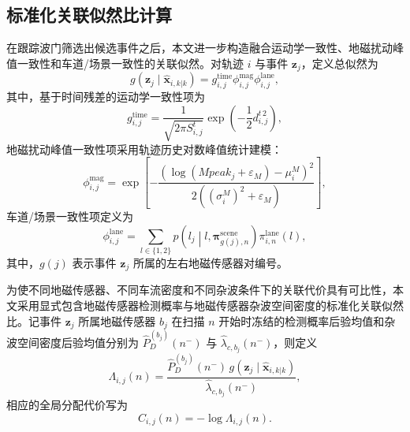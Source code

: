 \documentclass{xdupgthesis}
\begin{document}
\subsection{标准化关联似然比计算}

在跟踪波门筛选出候选事件之后，本文进一步构造融合运动学一致性、地磁扰动峰值一致性和车道/场景一致性的关联似然。对轨迹 $i$ 与事件 $\mathbf z_j$，定义总似然为
\begin{equation}
	g(\mathbf z_j\mid \hat{\mathbf x}_{i,k|k})
	=
	g_{i,j}^{\mathrm{time}}
	\phi_{i,j}^{\mathrm{mag}}
	\phi_{i,j}^{\mathrm{lane}},
	\label{eq:ch3_total_likelihood}
\end{equation}
其中，基于时间残差的运动学一致性项为
\begin{equation}
	g_{i,j}^{\mathrm{time}}
	=
	\frac{1}{\sqrt{2\pi S^{t}_{i,j}}}
	\exp\left(-\frac{1}{2}d^{t\,2}_{i,j}\right),
	\label{eq:ch3_g_time}
\end{equation}
地磁扰动峰值一致性项采用轨迹历史对数峰值统计建模：
\begin{equation}
	\phi_{i,j}^{\mathrm{mag}}
	=
	\exp\left[
	-\frac{
		\left(
		\log(Mpeak_j+\varepsilon_M)-\mu_i^{M}
		\right)^2
	}{2\left((\sigma_i^{M})^2+\varepsilon_M\right)}
	\right],
	\label{eq:ch3_phi_mag}
\end{equation}
车道/场景一致性项定义为
\begin{equation}
	\phi_{i,j}^{\mathrm{lane}}
	=
	\sum_{l\in\{1,2\}}
	p\!\left(l_j\middle|l,\boldsymbol\pi_{g(j),n}^{\mathrm{scene}}\right)
	\pi_{i,n}^{\mathrm{lane}}(l),
	\label{eq:ch3_phi_lane}
\end{equation}
其中，$g(j)$ 表示事件 $\mathbf z_j$ 所属的左右地磁传感器对编号。

为使不同地磁传感器、不同车流密度和不同杂波条件下的关联代价具有可比性，本文采用显式包含地磁传感器检测概率与地磁传感器杂波空间密度的标准化关联似然比。记事件 $\mathbf z_j$ 所属地磁传感器 $b_j$ 在扫描 $n$ 开始时冻结的检测概率后验均值和杂波空间密度后验均值分别为 $\hat P_D^{(b_j)}(n^-)$ 与 $\hat\lambda_{c,b_j}(n^-)$，则定义
\begin{equation}
	\Lambda_{i,j}(n)
	=
	\frac{\hat P_D^{(b_j)}(n^-)\,g(\mathbf z_j\mid \hat{\mathbf x}_{i,k|k})}{\hat\lambda_{c,b_j}(n^-)},
	\label{eq:ch3_assoc_ratio}
\end{equation}
相应的全局分配代价写为
\begin{equation}
	C_{i,j}(n)=-\log \Lambda_{i,j}(n).
	\label{eq:ch3_assoc_cost}
\end{equation}
\end{document}
